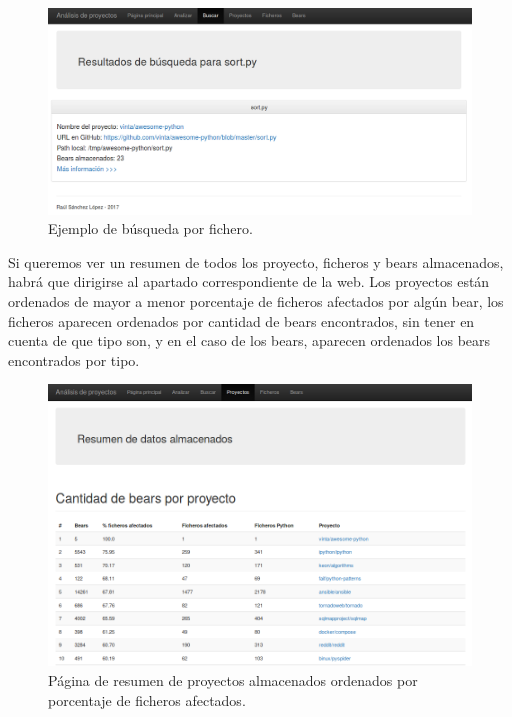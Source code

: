 \documentclass[a4paper, 12pt]{book}
\begin{document}
\begin{figure}[H]
  \centering
  \includegraphics[width=12cm, keepaspectratio]{img/resultadoBuscar}
  \caption{Ejemplo de búsqueda por fichero.}
  \label{fig:resultadoBuscar}
\end{figure}

Si queremos ver un resumen de todos los proyecto, ficheros y bears almacenados, habrá que dirigirse al apartado correspondiente de la web. Los proyectos están ordenados de mayor a menor porcentaje de ficheros afectados por algún bear, los ficheros aparecen ordenados por cantidad de bears encontrados, sin tener en cuenta de que tipo son, y en el caso de los bears, aparecen ordenados los bears encontrados por tipo.

\begin{figure}[H]
  \centering
  \includegraphics[width=12cm, keepaspectratio]{img/resumenProyectos}
  \caption{Página de resumen de proyectos almacenados ordenados por porcentaje de ficheros afectados.}
  \label{fig:resumenProyectos}
\end{figure}
\end{document}
